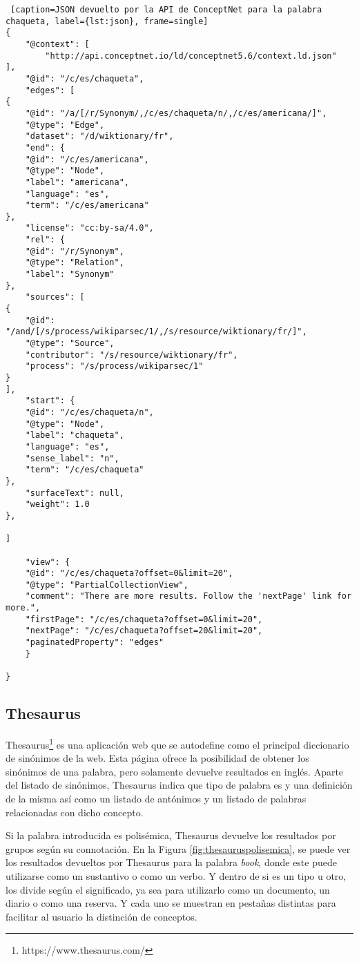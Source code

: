 \begin{lstlisting} [caption=JSON devuelto por la API de ConceptNet para la palabra chaqueta, label={lst:json}, frame=single]
{
	"@context": [
		"http://api.conceptnet.io/ld/conceptnet5.6/context.ld.json"
],
	"@id": "/c/es/chaqueta",
	"edges": [
{
	"@id": "/a/[/r/Synonym/,/c/es/chaqueta/n/,/c/es/americana/]",
	"@type": "Edge",
	"dataset": "/d/wiktionary/fr",
	"end": {
	"@id": "/c/es/americana",
	"@type": "Node",
	"label": "americana",
	"language": "es",
	"term": "/c/es/americana"
},
	"license": "cc:by-sa/4.0",
	"rel": {
	"@id": "/r/Synonym",
	"@type": "Relation",
	"label": "Synonym"
},
	"sources": [
{
	"@id": "/and/[/s/process/wikiparsec/1/,/s/resource/wiktionary/fr/]",
	"@type": "Source",
	"contributor": "/s/resource/wiktionary/fr",
	"process": "/s/process/wikiparsec/1"
}
],
	"start": {
	"@id": "/c/es/chaqueta/n",
	"@type": "Node",
	"label": "chaqueta",
	"language": "es",
	"sense_label": "n",
	"term": "/c/es/chaqueta"
},
	"surfaceText": null,
	"weight": 1.0
},

]

	"view": {
	"@id": "/c/es/chaqueta?offset=0&limit=20",
	"@type": "PartialCollectionView",
	"comment": "There are more results. Follow the 'nextPage' link for more.",
	"firstPage": "/c/es/chaqueta?offset=0&limit=20",
	"nextPage": "/c/es/chaqueta?offset=20&limit=20",
	"paginatedProperty": "edges"
	}

}
\end{lstlisting} 


\subsection{Thesaurus}
\label{cap:subsec:thesaurus}
Thesaurus\footnote{https://www.thesaurus.com/} es una aplicación web que se autodefine como el principal diccionario de sinónimos de la web. Esta página ofrece la posibilidad de obtener los sinónimos de una palabra, pero solamente devuelve resultados en inglés. Aparte del listado de sinónimos, Thesaurus indica que tipo de palabra es y una definición de la misma así como un listado de antónimos y un listado de palabras relacionadas con dicho concepto. 

Si la palabra introducida es polisémica, Thesaurus devuelve los resultados por grupos según su connotación. En la Figura \ref{fig:thesauruspolisemica}, se puede ver los resultados devueltos por Thesaurus para la palabra \textit{book}, donde este puede utilizarse como un sustantivo o como un verbo. Y dentro de si es un tipo u otro, los divide según el significado, ya sea para utilizarlo como un documento, un diario o como una reserva. Y cada uno se muestran en pestañas distintas para facilitar al usuario la distinción de conceptos.

